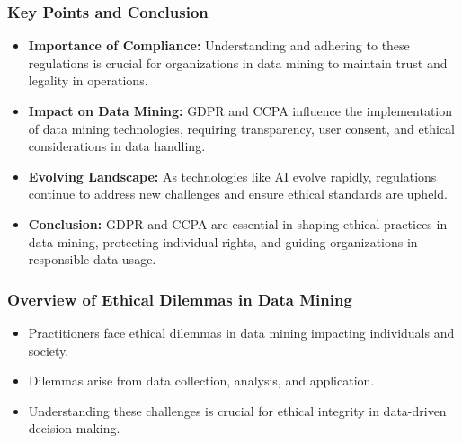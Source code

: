 \documentclass[aspectratio=169]{beamer}
\begin{document}
\begin{frame}[fragile]
    \frametitle{Key Points and Conclusion}
    \begin{itemize}
        \item \textbf{Importance of Compliance:} Understanding and adhering to these regulations is crucial for organizations in data mining to maintain trust and legality in operations.
        
        \item \textbf{Impact on Data Mining:} GDPR and CCPA influence the implementation of data mining technologies, requiring transparency, user consent, and ethical considerations in data handling.
        
        \item \textbf{Evolving Landscape:} As technologies like AI evolve rapidly, regulations continue to address new challenges and ensure ethical standards are upheld.
        
        \item \textbf{Conclusion:} GDPR and CCPA are essential in shaping ethical practices in data mining, protecting individual rights, and guiding organizations in responsible data usage.
    \end{itemize}
\end{frame}

\begin{frame}[fragile]
    \titlepage
\end{frame}

\begin{frame}[fragile]
    \frametitle{Overview of Ethical Dilemmas in Data Mining}
    \begin{itemize}
        \item Practitioners face ethical dilemmas in data mining impacting individuals and society.
        \item Dilemmas arise from data collection, analysis, and application.
        \item Understanding these challenges is crucial for ethical integrity in data-driven decision-making.
    \end{itemize}
\end{frame}
\end{document}
